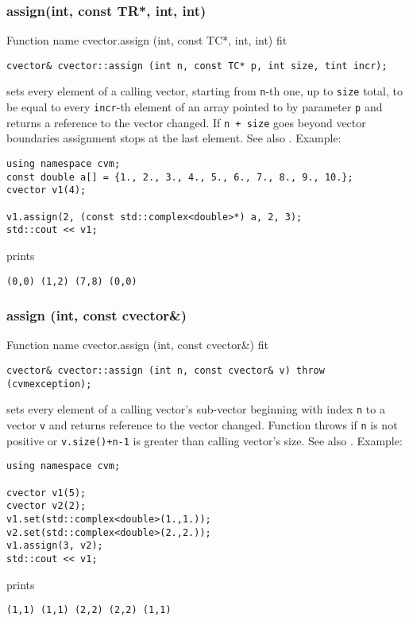 \subsubsection{assign(int, const TR*, int, int)}
Function%
\pdfdest name {cvector.assign (int, const TC*, int, int)} fit
\begin{verbatim}
cvector& cvector::assign (int n, const TC* p, int size, tint incr);
\end{verbatim}
sets every element of a calling vector, starting from \Based \verb"n"-th one,
up to \verb"size" total,
to be equal to
every \verb"incr"-th element of an array  pointed to by parameter \verb"p"
and returns a reference to the vector changed.
If \verb"n + size" goes beyond vector boundaries assignment stops at the last element.
See also .
Example:
\begin{Verbatim}
using namespace cvm;
const double a[] = {1., 2., 3., 4., 5., 6., 7., 8., 9., 10.};
cvector v1(4);

v1.assign(2, (const std::complex<double>*) a, 2, 3);
std::cout << v1;
\end{Verbatim}
prints
\begin{Verbatim}
(0,0) (1,2) (7,8) (0,0)
\end{Verbatim}
\newpage



\subsubsection{assign (int, const cvector\&)}
Function%
\pdfdest name {cvector.assign (int, const cvector&)} fit
\begin{verbatim}
cvector& cvector::assign (int n, const cvector& v) throw (cvmexception);
\end{verbatim}
sets every element of a calling vector's sub-vector beginning with
\Based index \verb"n" to a vector \verb"v" and returns 
reference to the vector changed. Function throws 
 if \verb"n" is not
positive or \verb"v.size()+n-1" is greater than  calling vector's
size. See also . Example:
\begin{Verbatim}
using namespace cvm;

cvector v1(5);
cvector v2(2);
v1.set(std::complex<double>(1.,1.));
v2.set(std::complex<double>(2.,2.));
v1.assign(3, v2);
std::cout << v1;
\end{Verbatim}
prints
\begin{Verbatim}
(1,1) (1,1) (2,2) (2,2) (1,1)
\end{Verbatim}
\newpage



